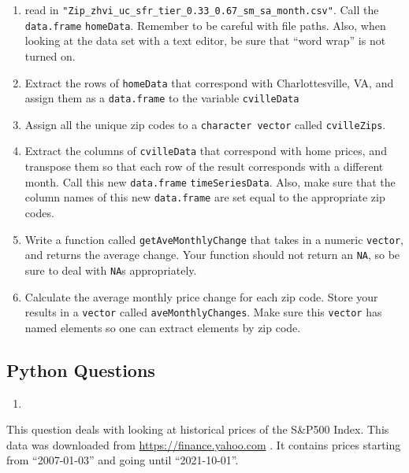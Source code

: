 \documentclass[
  12pt,
  krantz2]{krantz}
\providecommand{\tightlist}{%
  \setlength{\itemsep}{0pt}\setlength{\parskip}{0pt}}
\begin{document}
\begin{enumerate}
\def\labelenumi{\alph{enumi})}
\tightlist
\item
  read in \texttt{"Zip\_zhvi\_uc\_sfr\_tier\_0.33\_0.67\_sm\_sa\_month.csv"}. Call the \texttt{data.frame} \texttt{homeData}. Remember to be careful with file paths. Also, when looking at the data set with a text editor, be sure that ``word wrap'' is not turned on.
\item
  Extract the rows of \texttt{homeData} that correspond with Charlottesville, VA, and assign them as a \texttt{data.frame} to the variable \texttt{cvilleData}
\item
  Assign all the unique zip codes to a \texttt{character\ vector} called \texttt{cvilleZips}.
\item
  Extract the columns of \texttt{cvilleData} that correspond with home prices, and transpose them so that each row of the result corresponds with a different month. Call this new \texttt{data.frame} \texttt{timeSeriesData}. Also, make sure that the column names of this new \texttt{data.frame} are set equal to the appropriate zip codes.
\item
  Write a function called \texttt{getAveMonthlyChange} that takes in a numeric \texttt{vector}, and returns the average change. Your function should not return an \texttt{NA}, so be sure to deal with \texttt{NA}s appropriately.
\item
  Calculate the average monthly price change for each zip code. Store your results in a \texttt{vector} called \texttt{aveMonthlyChanges}. Make sure this \texttt{vector} has named elements so one can extract elements by zip code.
\end{enumerate}

\hypertarget{python-questions-6}{%
\subsection{Python Questions}\label{python-questions-6}}

\begin{enumerate}
\def\labelenumi{\arabic{enumi}.}
\tightlist
\item
\end{enumerate}

This question deals with looking at historical prices of the S\&P500 Index. This data was downloaded from \url{https://finance.yahoo.com} \citep{gspc_data}. It contains prices starting from ``2007-01-03'' and going until ``2021-10-01''.
\end{document}
